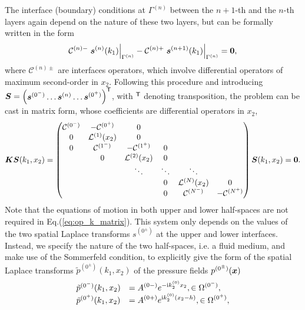 The interface (boundary) conditions at $\Gamma^{(n)}$ between the $n+1$-th and the $n$-th layers again depend on the nature of these two layers, but can be formally written in the form
    \begin{equation}
        \mathcal C^{(n)-} \left. \boldsymbol s^{(n)}(k_1) \right|_{\Gamma^{(n)}} - \mathcal C^{(n)+} \left. \boldsymbol s^{(n+1)}(k_1) \right|_{\Gamma^{(n)}}= \boldsymbol 0,
        \label{eq:coupling_operators}
    \end{equation}
 where $\mathcal C^{(n)\pm}$ are interfaces operators, which involve differential operators of maximum second-order in $x_2$. Following this procedure and introducing $\boldsymbol S= \begin{pmatrix} \boldsymbol s^{(0^-)}\ldots \boldsymbol s^{(n)} \ldots \boldsymbol s^{(0^+)} \end{pmatrix}^\mathsf T$, with $^\mathsf T$ denoting transposition, the problem can be cast in matrix form, whose coefficients are differential operators in $x_2$,
    \begin{equation} \boldsymbol K \boldsymbol S(k_1, x_2) = 
        \begin{pmatrix}
            \mathcal C^{(0^-)} & -\mathcal C^{(0^+)} & 0 & \\
            0 & \mathcal L^{(1)}(x_2) & 0 &  \\
            0 & \mathcal C^{(1^-)} & -\mathcal C^{(1^+)} & 0   & \\
            & 0 & \mathcal L^{(2)}(x_2)  & 0  & \\
            & & \ddots & \ddots & \ddots \\
            & & & 0 & \mathcal L^{(N)}(x_2)  & 0 \\
            & & & 0 & \mathcal C^{(N^-)} & -\mathcal C^{(N^+)}
        \end{pmatrix}\boldsymbol S (k_1, x_2) = \boldsymbol 0.
        \label{eq:op_k_matrix}
    \end{equation}
Note that the equations of motion in both upper and lower half-spaces are not required in Eq.(\ref{eq:op_k_matrix}). This system only depends on the values of the two spatial Laplace transforms $s^{(0^\pm)}$ at the upper and lower interfaces. Instead, we specify the nature of the two half-spaces, i.e. a fluid medium, and make use of the Sommerfeld condition, to explicitly give the form of the spatial Laplace transforms $\tilde{p}^{(0^\pm)}(k_1,x_2)$ of the pressure fields $p^{(0^\pm)}(\boldsymbol x)$
    \begin{equation}
    \begin{array}{ll}
        \tilde{p}^{(0^-)}(k_1,x_2) &\displaystyle = A^{(0-)} e^{-\mathrm i  k_{2}^{(0)} x_2},  \in \Omega^{(0^-)},\\
        \tilde{p}^{(0^+)}(k_1,x_2) &\displaystyle= A^{(0+)} e^{\mathrm i  k_{2}^{(0)} (x_2 - h)}, \in \Omega^{(0^+)},\\
        \end{array}
        \label{eq:outgoing_pressure_field}
    \end{equation}
